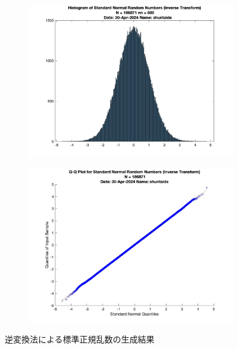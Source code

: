 \begin{figure}
	\centering
	\begin{subfigure}{0.48\linewidth}
		\centering
		\includegraphics[width=0.8\linewidth]{src/figures/inverse-transform/Inverse_trans_hist_N=186871_nn=500.jpg}
	\end{subfigure}
	\begin{subfigure}{0.48\linewidth}
		\centering
		\includegraphics[width=0.8\linewidth]{src/figures/inverse-transform/Inverse_trans_qqpl_N=186871.jpg}
	\end{subfigure}
	\caption{逆変換法による標準正規乱数の生成結果}\label{fig:inverse-transform-random}
\end{figure}
